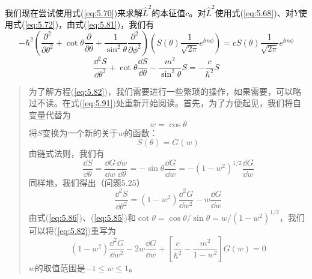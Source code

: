     我们现在尝试使用式(\ref{eq:5.70})来求解$\hat{L}^2$的本征值$c$。对$\hat{L}^2$使用式(\ref{eq:5.68})、对$Y$使用式(\ref{eq:5.72})，由式(\ref{eq:5.81})，我们有
    \begin{equation*}
        -\hbar^2\left(\frac{\partial^2}{\partial\theta^2} + \cot\theta\frac{\partial}{\partial\theta} + \frac{1}{\sin^2\theta}\frac{\partial^2}{\partial\phi^2}\right)\left(S\left(\theta\right)\frac{1}{\sqrt{2\pi}}e^{\ii m\phi}\right) = cS\left(\theta\right)\frac{1}{\sqrt{2\pi}}e^{\ii m\phi}
    \end{equation*}
    \begin{equation}
        \frac{\dd ^2S}{\dd \theta^2}+\cot\theta\frac{\dd S}{\dd \theta} - \frac{m^2}{\sin^2\theta}S = -\frac{c}{\hbar^2}S
        \label{eq:5.82}
    \end{equation}
    \begin{quote}
        \small
        \noindent 为了解方程(\ref{eq:5.82})，我们需要进行一些繁琐的操作，如果需要，可以略过不读。在式(\ref{eq:5.91})处重新开始阅读。首先，为了方便起见，我们将自变量代替为
        \begin{equation}
            w = \cos\theta
            \label{eq:5.83}
        \end{equation}
        将$S$变换为一个新的关于$w$的函数：
        \begin{equation}
            S\left(\theta\right) = G\left(w\right)
            \label{eq:5.84}
        \end{equation}
        由链式法则，我们有
        \begin{equation}
            \frac{\dd S}{\dd \theta} = \frac{\dd G}{\dd w}\frac{\dd w}{\dd \theta} = -\sin\theta\frac{\dd G}{\dd w} = -\left(1-w^2\right)^{1/2}\frac{\dd G}{\dd w}
            \label{eq:5.85}
        \end{equation}
        同样地，我们得出（问题5.25）
        \begin{equation}
            \frac{\dd ^2S}{\dd \theta^2} = \left(1-w^2\right)\frac{\dd ^2G}{\dd w^2} - w\frac{\dd G}{\dd w}
            \label{eq:5.86}
        \end{equation}
        由式(\ref{eq:5.86})、(\ref{eq:5.85})和$\cot\theta = \cos\theta/\sin\theta = w/\left(1-w^2\right)^{1/2}$，我们可以将(\ref{eq:5.82})重写为
        \begin{equation}
            \left(1-w^2\right)\frac{\dd ^2G}{\dd w^2} - 2w\frac{\dd G}{\dd w}+\left[\frac{c}{\hbar^2}-\frac{m^2}{1-w^2}\right]G\left(w\right) = 0
            \label{eq:5.87}
        \end{equation}
        $w$的取值范围是$-1 \le w \le 1$。


\end{quote}

